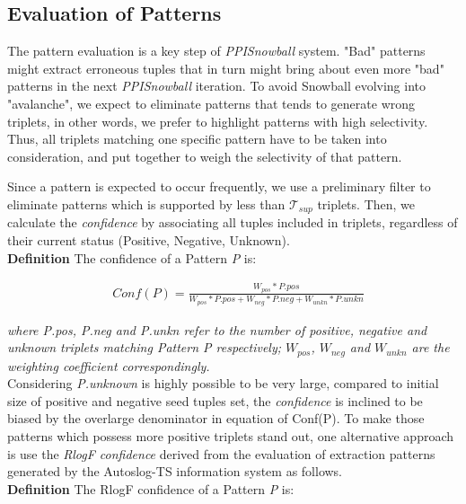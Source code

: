 \subsection{Evaluation of Patterns}
\label{EvalPatterns}

The pattern evaluation is a key step of \emph{PPISnowball} system. "Bad" patterns might extract erroneous tuples that in turn might bring about even more "bad" patterns in the next \emph{PPISnowball} iteration. To avoid Snowball evolving into "avalanche", we expect to eliminate patterns that tends to generate wrong triplets, in other words, we prefer to highlight patterns with high selectivity. Thus, all triplets matching one specific pattern have to be taken into consideration, and put together to weigh the selectivity of that pattern.

Since a pattern is expected to occur frequently, we use a preliminary filter to eliminate patterns which is supported by less than $\mathcal {T}_{sup}$ triplets. Then, we calculate the \emph{confidence} by associating all tuples included in triplets, regardless of their current status (Positive, Negative, Unknown).\\

\textbf{Definition} The confidence of a Pattern \emph{P} is:

\begin{equation}
\begin{aligned}
&Conf(P)= \frac{W_{pos}*P.pos}{W_{pos}*P.pos + W_{neg}*P.neg + W_{unkn}*P.unkn}
\label{eq:conf}
\end{aligned}
\end{equation}

\emph{where P.pos, P.neg and P.unkn refer to the number of positive, negative and unknown triplets matching Pattern P respectively; $W_{pos}$, $W_{neg}$ and $W_{unkn}$ are the weighting coefficient correspondingly.}\\

Considering \emph{P.unknown} is highly possible to be very large, compared to initial size of positive and negative seed tuples set, the \emph{confidence} is inclined to be biased by the overlarge denominator in equation of Conf(P). To make those patterns which possess more positive triplets stand out, one alternative approach is use the \emph{RlogF confidence} derived from the evaluation of extraction patterns generated by the Autoslog-TS information system\cite{DBLP:conf/aaai/Riloff96} as follows.\\

\textbf{Definition} The RlogF confidence of a Pattern \emph{P} is:

